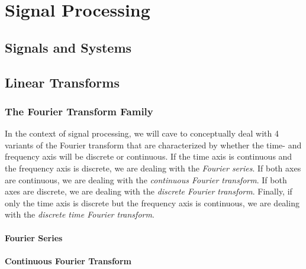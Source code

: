 \chapter{Signal Processing}

\section{Signals and Systems}



\section{Linear Transforms}

\subsection{The Fourier Transform Family}
In the context of signal processing, we will cave to conceptually deal with 4 variants of the Fourier transform that are characterized by whether the time- and frequency axis will be discrete or continuous. If the time axis is continuous and the frequency axis is discrete, we are dealing with the \emph{Fourier series}. If both axes are continuous, we are dealing with the \emph{continuous Fourier transform}. If both axes are discrete, we are dealing with the \emph{discrete Fourier transform}. Finally, if only the time axis is discrete but the frequency axis is continuous, we are dealing with the \emph{discrete time Fourier transform}. 


\subsubsection{Fourier Series}

\subsubsection{Continuous Fourier Transform}

